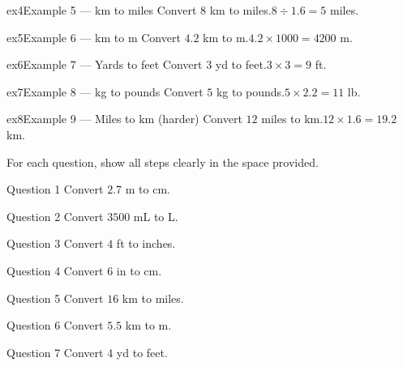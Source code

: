 \documentclass[11pt]{article}
\begin{document}
\begin{example}{ex4}{Example 5 --- km to miles}
Convert $8$ km to miles.\soln $8\div1.6=5$ miles.
\end{example}

\begin{example}{ex5}{Example 6 --- km to m}
Convert $4.2$ km to m.\soln $4.2\times1000=4200$ m.
\end{example}

\begin{example}{ex6}{Example 7 --- Yards to feet}
Convert $3$ yd to feet.\soln $3\times3=9$ ft.
\end{example}

\begin{example}{ex7}{Example 8 --- kg to pounds}
Convert $5$ kg to pounds.\soln $5\times2.2=11$ lb.
\end{example}

\begin{example}{ex8}{Example 9 --- Miles to km (harder)}
Convert $12$ miles to km.\soln $12\times1.6=19.2$ km.
\end{example}

\clearpage
{}
For each question, show all steps clearly in the space provided.

\begin{qbox}{Question 1}
Convert $2.7$ m to cm.\workspace{1.8cm}
\end{qbox}

\begin{qbox}{Question 2}
Convert $3500$ mL to L.\workspace{1.8cm}
\end{qbox}

\begin{qbox}{Question 3}
Convert $4$ ft to inches.\workspace{1.8cm}
\end{qbox}

\begin{qbox}{Question 4}
Convert $6$ in to cm.\workspace{1.8cm}
\end{qbox}

\begin{qbox}{Question 5}
Convert $16$ km to miles.\workspace{1.8cm}
\end{qbox}

\begin{qbox}{Question 6}
Convert $5.5$ km to m.\workspace{1.8cm}
\end{qbox}

\begin{qbox}{Question 7}
Convert $4$ yd to feet.\workspace{1.8cm}
\end{qbox}
\end{document}

